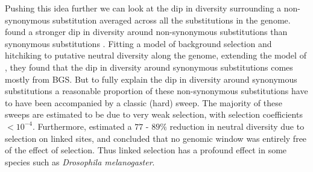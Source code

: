 Pushing this idea further we can look at the dip in diversity
surrounding a non-synonymous substitution averaged across all the
substitutions in the genome. \citet{elyashiv2016genomic} found a
stronger dip in diversity around non-synonymous substitutions than
synonymous substitutions \citep[see also
][]{sattath2011pervasive}. Fitting a model of background selection and
hitchiking to putative neutral diversity along the genome, extending
the model of \citet{Mcvicker:09}, they found that
the dip in diversity around synonymous substitutions comes mostly from
BGS. But to fully explain the dip in diversity around synonymous
substitutions a reasonable proportion of these non-synonymous
substitutions have to have been accompanied by a classic (hard)
sweep. The majority of these sweeps are estimated to be due to very
weak selection, with selection coefficients $<10^{-4}$. Furthermore, \citet{elyashiv2014genomic}  estimated a
 $77$ - $89\%$ reduction in neutral diversity due to selection on linked sites, and concluded that no genomic window was entirely
free of the effect of selection. Thus linked selection has a profound
effect in some species such as {\it Drosophila melanogaster}. 





